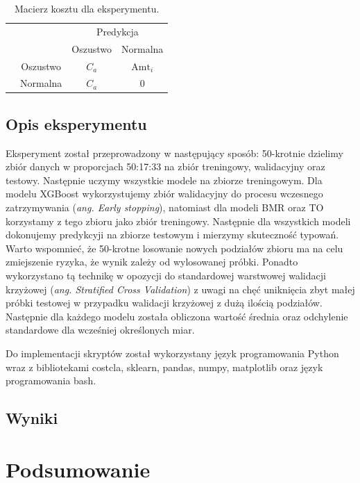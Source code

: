 \documentclass{book}
\begin{document}
	\begin{table}[h]
		\begin{center}
			\makegapedcells
			\begin{tabular}{cc|cc}
				\multicolumn{2}{c}{}     &   \multicolumn{2}{c}{Predykcja} \\
				&            &   Oszustwo &   Normalna     \\ 
				\cline{2-4}
				\multirow{2}{*}{\rotatebox[origin=c]{90}{Prawda}} & Oszustwo   & $C_a$         & $\text{Amt}_i$              \\
				& Normalna   & $C_a$         & $0$              \\ 
				\cline{2-4}
			\end{tabular}
		\end{center}
		\caption{Macierz kosztu dla eksperymentu.}
		\label{macierz-kosztu-eksperyment}
	\end{table}
	
\section{Opis eksperymentu}
	Eksperyment został przeprowadzony w następujący sposób:
	50-krotnie dzielimy zbiór danych w proporcjach 50:17:33 na zbiór treningowy, walidacyjny oraz testowy. Następnie uczymy wszystkie modele na zbiorze treningowym. Dla modelu XGBoost wykorzystujemy zbiór walidacyjny do procesu wczesnego zatrzymywania (\textit{ang. Early stopping}), natomiast dla modeli BMR oraz TO korzystamy z tego zbioru jako zbiór treningowy. Następnie dla wszystkich modeli dokonujemy predykcyji na zbiorze testowym i mierzymy skuteczność typowań. Warto wspomnieć, że 50-krotne losowanie nowych podziałów zbioru ma na celu zmiejszenie ryzyka, że wynik zależy od wylosowanej próbki. Ponadto wykorzystano tą technikę w opozycji do standardowej warstwowej walidacji krzyżowej (\textit{ang. Stratified Cross Validation}) z uwagi na chęć uniknięcia zbyt małej próbki testowej w przypadku walidacji krzyżowej z dużą ilością podziałów. Następnie dla każdego modelu została obliczona wartość średnia oraz odchylenie standardowe dla wcześniej określonych miar.
	
	Do implementacji skryptów został wykorzystany język programowania Python wraz z bibliotekami costcla, sklearn, pandas, numpy, matplotlib oraz język programowania bash.

\section{Wyniki}


\chapter{Podsumowanie}


\end{document}
